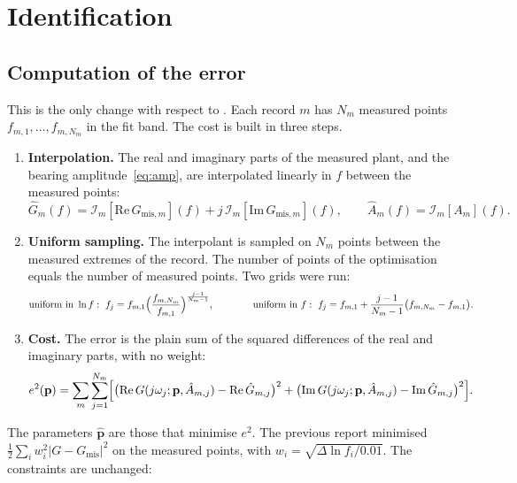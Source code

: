 \documentclass[10pt,a4paper]{article}
\numberwithin{equation}{section}
\begin{document}
\section{Identification}\label{sec:ident}
\subsection{Computation of the error}\label{sec:cost}
This is the only change with respect to . Each record $m$ has $N_m$ measured points $f_{m,1},\dots,f_{m,N_m}$ in the fit band. The cost is built in three steps.
\begin{enumerate}
\item \textbf{Interpolation.} The real and imaginary parts of the measured plant, and the bearing amplitude~\eqref{eq:amp}, are interpolated linearly in $f$ between the measured points:
\begin{equation}
\hat G_m(f)=\mathcal I_m[\mathrm{Re}\,G_{\mathrm{mis},m}](f)+j\,\mathcal I_m[\mathrm{Im}\,G_{\mathrm{mis},m}](f),\qquad \hat A_m(f)=\mathcal I_m[A_m](f).
\end{equation}
\item \textbf{Uniform sampling.} The interpolant is sampled on $N_m$ points between the measured extremes of the record. The number of points of the optimisation equals the number of measured points. Two grids were run:
\begin{equation}
\text{uniform in }\ln f:\ f_j=f_{m,1}\Bigl(\frac{f_{m,N_m}}{f_{m,1}}\Bigr)^{\frac{j-1}{N_m-1}},\qquad\qquad \text{uniform in }f:\ f_j=f_{m,1}+\frac{j-1}{N_m-1}\bigl(f_{m,N_m}-f_{m,1}\bigr).
\end{equation}
\item \textbf{Cost.} The error is the plain sum of the squared differences of the real and imaginary parts, with no weight:
\begin{equation}
e^2(\mathbf p)=\sum_m\sum_{j=1}^{N_m}\Bigl[\bigl(\mathrm{Re}\,G(j\omega_j;\mathbf p,\hat A_{m,j})-\mathrm{Re}\,\hat G_{m,j}\bigr)^2+\bigl(\mathrm{Im}\,G(j\omega_j;\mathbf p,\hat A_{m,j})-\mathrm{Im}\,\hat G_{m,j}\bigr)^2\Bigr].\label{eq:cost}
\end{equation}
\end{enumerate}
The parameters $\hat{\mathbf p}$ are those that minimise $e^2$. The previous report minimised $\frac12\sum_i w_i^2|G-G_\mathrm{mis}|^2$ on the measured points, with $w_i=\sqrt{\Delta\ln f_i/0.01}$. The constraints are unchanged:
\end{document}
